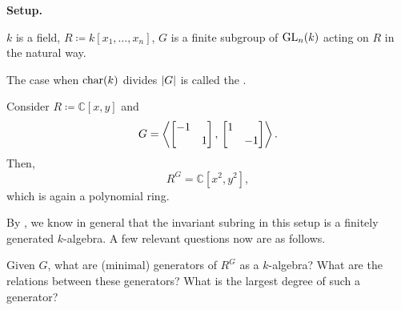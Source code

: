 \documentclass[12pt]{article}
\begin{document}
\begin{tcolorbox}[parbox=false]
	\textbf{Setup.} 

	$k$ is a field, $R \coloneqq k[x_{1}, \ldots, x_{n}]$, $G$ is a finite subgroup of $\operatorname{GL}_{n}(k)$ acting on $R$ in the natural way.
\end{tcolorbox}
The case when $\operatorname{char}(k)$ divides ${\left\lvert G \right\lvert}$ is called the .



\begin{ex}
	Consider $R \coloneqq \mathbb{C}[x, y]$ and
	\begin{equation*} 
		G = \left\langle \begin{bmatrix} -1 &  \\  & 1 \end{bmatrix},\, \begin{bmatrix} 1 &  \\  & -1 \end{bmatrix} \right\rangle.
	\end{equation*}
	Then,
	\begin{equation*} 
		R^{G} = \mathbb{C}[x^{2}, y^{2}],
	\end{equation*}
	which is again a polynomial ring.
\end{ex}

By , we know in general that the invariant subring in this setup is a finitely generated $k$-algebra. A few relevant questions now are as follows.

\begin{ques}
	Given $G$, what are (minimal) generators of $R^{G}$ as a $k$-algebra? What are the relations between these generators? What is the largest degree of such a generator?
\end{ques}
\end{document}
